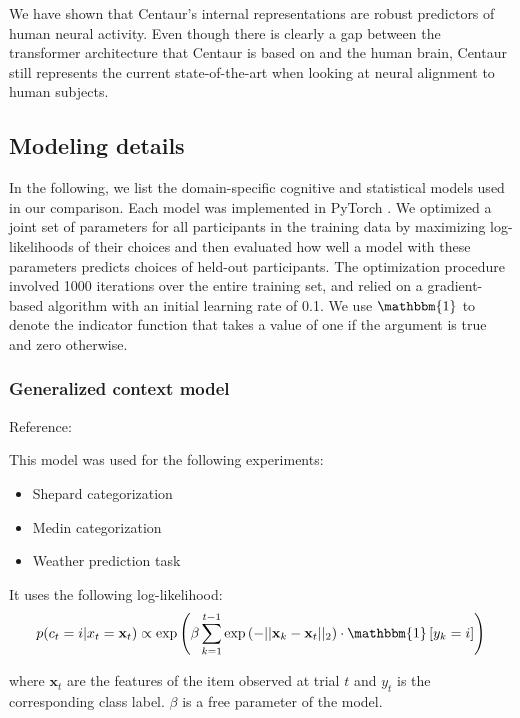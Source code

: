 \documentclass[pdflatex,sn-nature]{sn-jnl}%
\theoremstyle{thmstyleone}%
\theoremstyle{thmstyletwo}%
\theoremstyle{thmstylethree}%
\begin{document}
We have shown that Centaur's internal representations are robust predictors of human neural activity. Even though there is clearly a gap between the transformer architecture that Centaur is based on and the human brain, Centaur still represents the current state-of-the-art when looking at neural alignment to human subjects.

\subsection*{Modeling details}

In the following, we list the domain-specific cognitive and statistical models used in our comparison. Each model was implemented in PyTorch \cite{10.5555/3454287.3455008}. We optimized a joint set of parameters for all participants in the training data by maximizing log-likelihoods of their choices and then evaluated how well a model with these parameters predicts choices of held-out participants. The optimization procedure involved 1000 iterations over the entire training set, and relied on a gradient-based algorithm \cite{defazio2024roadscheduled} with an initial learning rate of 0.1. We use $\mathbbm{1}$ to denote the indicator function that takes a value of one if the argument is true and zero otherwise.

\subsubsection*{Generalized context model}

Reference: \cite{nosofsky2011generalized} 

\noindent This model was used for the following experiments:
\begin{itemize}
    \item Shepard categorization
    \item Medin categorization
    \item Weather prediction task
\end{itemize}

\noindent It uses the following log-likelihood:
\begin{equation*}
    p(c_t = i | x_t = \mathbf{x}_t) \propto \text{exp} \left( \beta \sum_{k=1}^{t-1} \text{exp} \left(-||\mathbf{x}_k - \mathbf{x}_t ||_2\right) \cdot \mathbbm{1}\left[y_k = i\right] \right)
\end{equation*}

\noindent where $\mathbf{x}_t$ are the features of the item observed at trial $t$ and $y_t$ is the corresponding class label. $\beta$ is a free parameter of the model.
 
\end{document}
